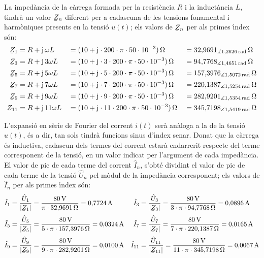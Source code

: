 \begin{exemple}
La imped\`{a}ncia de la c\`{a}rrega formada per la resist\`{e}ncia $R$ i la
induct\`{a}ncia $L$, tindr\`{a} un valor $\cmplx{Z}_n$ diferent per a
cadascuna de les tensions fonamental i harm\`{o}niques presents en la
tensi\'{o} $u(t)$; els valors de $\cmplx{Z}_n$ per als primes \'{\i}ndex s\'{o}n:
\begin{alignat*}{3}
    \cmplx{Z}_1 &= R + \ju\, \omega L &&= (10 + \ju\cdot 200\cdot \pi\cdot 50\cdot 10^{-3})\unit{\ohm} &&=32{,}9691_{\measuredangle
    1{,}2626\unit{rad}}\unit{\ohm}\\
    \cmplx{Z}_3 &= R + \ju\, 3 \omega L &&= (10 + \ju\cdot 3\cdot 200\cdot \pi\cdot 50\cdot 10^{-3})\unit{\ohm} &&=94{,}7768_{\measuredangle
    1{,}4651\unit{rad}}\unit{\ohm}\\
    \cmplx{Z}_5 &= R + \ju\, 5 \omega L &&= (10 + \ju\cdot 5\cdot 200\cdot \pi\cdot 50\cdot 10^{-3})\unit{\ohm} &&=157{,}3976_{\measuredangle
    1{,}5072\unit{rad}}\unit{\ohm}\\
    \cmplx{Z}_7 &= R + \ju\, 7 \omega L &&= (10 + \ju\cdot 7\cdot 200\cdot \pi\cdot 50\cdot 10^{-3})\unit{\ohm} &&=220{,}1387_{\measuredangle
    1{,}5254\unit{rad}}\unit{\ohm}\\
    \cmplx{Z}_9 &= R + \ju\, 9 \omega L &&= (10 + \ju\cdot 9\cdot 200\cdot \pi\cdot 50\cdot 10^{-3})\unit{\ohm} &&=282{,}9201_{\measuredangle
    1{,}5354\unit{rad}}\unit{\ohm}\\
    \cmplx{Z}_{11} &= R + \ju\, 11 \omega L &&= (10 + \ju\cdot 11\cdot 200\cdot \pi\cdot 50\cdot 10^{-3})\unit{\ohm} &&=345{,}7198_{\measuredangle
    1{,}5419\unit{rad}}\unit{\ohm}
\end{alignat*}

L'expansi\'{o} en s\`{e}rie de Fourier del corrent $i(t)$ ser\`{a} an\`{a}loga a la
de la tensi\'{o} $u(t)$, \'{e}s a dir, tan sols tindr\`{a} funcions sinus
d'\'{\i}ndex senar. Donat que la c\`{a}rrega \'{e}s inductiva, cadascun dels
termes del corrent estar\`{a} endarrerit respecte del terme corresponent
de la tensi\'{o}, en un valor indicat per l'argument de cada imped\`{a}ncia.
El valor de pic de cada terme del corrent $\hat{I}_n$, s'obt\'{e}
dividint el valor de pic de cada terme de la tensi\'{o} $\hat{U}_n$ pel
m\`{o}dul de la imped\`{a}ncia corresponent; els valors de $\hat{I}_n$ per
als primes \'{\i}ndex s\'{o}n:
\begin{align*}
    \hat{I}_1 &= \frac{\hat{U}_1}{|\cmplx{Z}_1|} = \frac{80\unit{V}}{\pi\cdot32{,}9691\unit{\ohm}} = 0{,}7724\unit{A}
    & \hat{I}_3 &= \frac{\hat{U}_3}{|\cmplx{Z}_3|} =\frac{80\unit{V}}{3\cdot\pi\cdot 94{,}7768\unit{\ohm}} = 0{,}0896\unit{A}\\[0.5ex]
    \hat{I}_5 &= \frac{\hat{U}_5}{|\cmplx{Z}_5|} =\frac{80\unit{V}}{5\cdot\pi\cdot 157{,}3976\unit{\ohm}} =0{,}0324\unit{A}
    & \hat{I}_7 &= \frac{\hat{U}_7}{|\cmplx{Z}_7|} =\frac{80\unit{V}}{7\cdot\pi\cdot 220{,}1387\unit{\ohm}} =
    0{,}0165\unit{A}\\[0.5ex]
    \hat{I}_9 &= \frac{\hat{U}_9}{|\cmplx{Z}_9|} =\frac{80\unit{V}}{9\cdot\pi\cdot 282{,}9201\unit{\ohm}} =
    0{,}0100\unit{A} & \hat{I}_{11} &= \frac{\hat{U}_{11}}{|\cmplx{Z}_{11}|} =\frac{80\unit{V}}
    {11\cdot\pi\cdot 345{,}7198\unit{\ohm}} =  0{,}0067\unit{A}
\end{align*}


\end{exemple}
